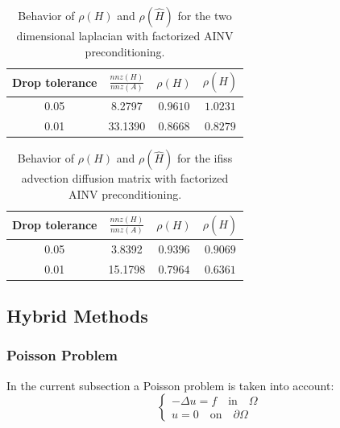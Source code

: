 \begin{table}[!h]
\centering
\begin{tabular}{|c|c|c|c|}
\hline
\textbf{Drop tolerance} & \textbf{$\frac{nnz(H)}{nnz(A)}$}& $\rho(H)$
&$\rho(\hat{H})$\\
\hline
 0.05 & 8.2797 & $0.9610$ & $1.0231$\\
\hline
 0.01 & 33.1390 & $0.8668$ & $0.8279$\\
\hline
\end{tabular}
\caption{Behavior of $\rho(H)$ and $\rho(\hat{H})$ for the two dimensional
laplacian with factorized AINV preconditioning.}
\label{tab:lap2d_ainv}
\end{table}

\begin{table}[!h]
\centering
\begin{tabular}{|c|c|c|c|}
\hline
\textbf{Drop tolerance} & \textbf{$\frac{nnz(H)}{nnz(A)}$}& $\rho(H)$
&$\rho(\hat{H})$\\
\hline
 0.05 & 3.8392 & $0.9396$ & $0.9069$\\
\hline
 0.01 & 15.1798 & $0.7964$ & $0.6361$\\
\hline
\end{tabular}
\caption{Behavior of $\rho(H)$ and $\rho(\hat{H})$ for the ifiss advection
diffusion matrix with factorized AINV preconditioning.}
\label{tab:ifiss_ainv}
\end{table}

\subsection{Hybrid Methods}

\subsubsection{Poisson Problem}

In the current subsection a Poisson problem is taken into account:
\begin{equation}
\begin{cases}
 -\Delta u = f \quad \text{in}\quad \Omega \\
 u=0\quad \text{on} \quad \partial\Omega
 \end{cases}
\end{equation}


